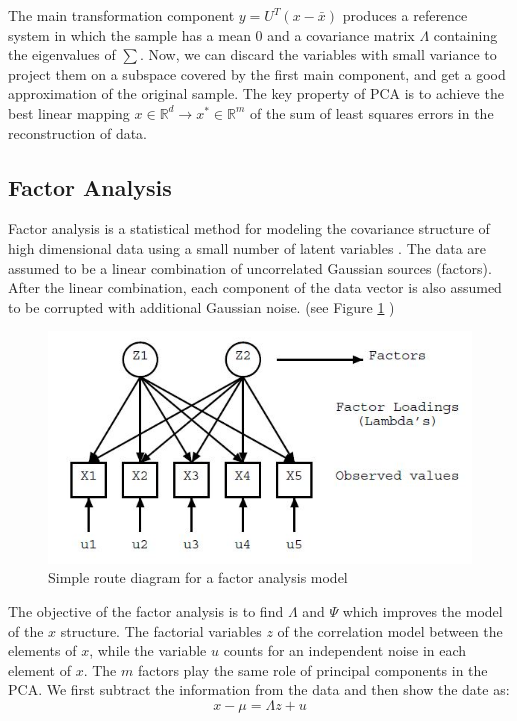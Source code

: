 \documentclass{article}
\begin{document}
The main transformation component $y= U^T(x-\bar{x})$  produces a reference system in which the sample has a mean $ 0 $ and a covariance matrix $\Lambda$ containing the eigenvalues of $\sum$. Now, we can discard the variables with small variance to project them on a subspace covered by the first main component, and get a good approximation of the original sample. The key property of PCA is to achieve the best linear mapping $x \in \mathbb{R}^d \rightarrow x^* \in \mathbb{R}^m$ of the sum of least squares errors in the reconstruction of data.

\subsection{Factor Analysis}
Factor analysis is a statistical method for modeling the covariance structure of high dimensional data using a small number of latent variables \cite{Ghahramani}. The data are assumed to be a linear combination of uncorrelated Gaussian sources (factors). After the linear combination, each component of the data vector is also assumed to be corrupted with additional Gaussian noise. (see Figure \ref{fig:fig_1} )
\begin{figure}[htp]\centering
\includegraphics[width=1.\columnwidth]{images_fractal/frac_1.JPG}
\caption{ Simple route diagram for a factor analysis model } 
\label{fig:fig_1}
\end{figure} 

The objective of the factor analysis is to find $\Lambda$ and $\Psi$ which improves the model of the $ x $ structure. The factorial variables $ z $ of the correlation model between the elements of $ x $, while the variable $ u $ counts for an independent noise in each element of $ x $. The $ m$ factors play the same role of principal components in the PCA. We first subtract the information from the data and then show the date as:
\begin{equation}
    x - \mu = \Lambda z + u
\end{equation}
\end{document}
